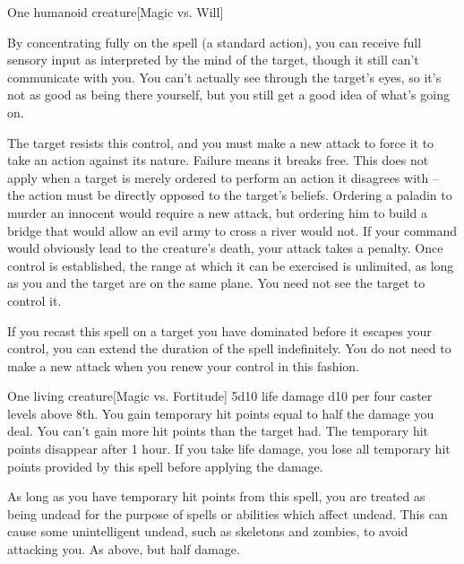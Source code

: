 \begin{spelltarget}{One humanoid creature}[Magic vs. Will]
    \par By concentrating fully on the spell (a standard action), you can receive full sensory input as interpreted by the mind of the target, though it still can't communicate with you. You can't actually see through the target's eyes, so it's not as good as being there yourself, but you still get a good idea of what's going on.
    \par The target resists this control, and you must make a new attack to force it to take an action against its nature. Failure means it breaks free. This does not apply when a target is merely ordered to perform an action it disagrees with -- the action must be directly opposed to the target's beliefs. Ordering a paladin to murder an innocent would require a new attack, but ordering him to build a bridge that would allow an evil army to cross a river would not. If your command would obviously lead to the creature's death, your attack takes a  penalty. Once control is established, the range at which it can be exercised is unlimited, as long as you and the target are on the same plane. You need not see the target to control it.
    \par If you recast this spell on a target you have dominated before it escapes your control, you can extend the duration of the spell indefinitely. You do not need to make a new attack when you renew your control in this fashion.
\end{spelltarget}

\spellrng{\rngclose}
\spelldur{\durlong}
\begin{spelltarget}{One living creature}[Magic vs. Fortitude]
    \spellsuccess 5d10 life damage \add d10 per four caster levels above 8th. You gain temporary hit points equal to half the damage you deal. You can't gain more hit points than the target had. The temporary hit points disappear after 1 hour. If you take life damage, you lose all temporary hit points provided by this spell before applying the damage.

    As long as you have temporary hit points from this spell, you are treated as being undead for the purpose of spells or abilities which affect undead. This can cause some unintelligent undead, such as skeletons and zombies, to avoid attacking you.
    \spellfailure As above, but half damage.
\end{spelltarget}

\begin{comment}
\subsubsection{E}
\end{comment}

